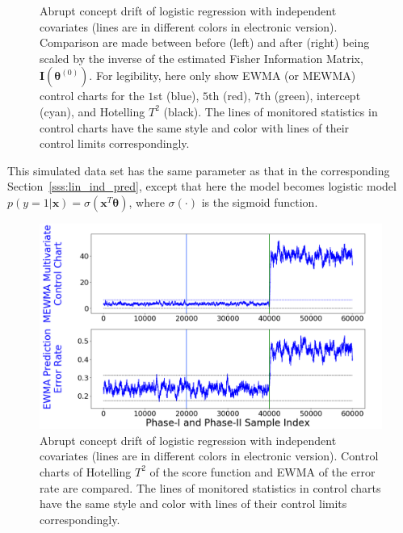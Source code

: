 \documentclass[twoside,11pt]{article}
\begin{document}
\begin{enumerate}[(I)]
\begin{figure}[!htbp]
  \caption{Abrupt concept drift of logistic regression with independent {covariates} (lines are in different colors in electronic version). Comparison are made between before (left) and after (right) being scaled by {the inverse of the estimated} Fisher Information Matrix, {$\mathbf {I} ( {\bm{\theta}} ^{(0)})$.} For legibility, here only show EWMA (or MEWMA) control charts for the $1$st (blue), $5$th (red), $7$th (green), intercept (cyan), and Hotelling $T^2$ (black). The lines of monitored statistics in control charts have the same style and color with lines of their control limits correspondingly.}
  \label{fig:log_reg_ind_X}
\end{figure}

This simulated data set has the same parameter as that in the corresponding Section~\ref{sss:lin_ind_pred}, except that here the model becomes {logistic model} {$p(y=1|\bm {x})= \sigma (\bm {x}^T\bm { \theta})$,} where $\sigma (\cdot)$ is the sigmoid function.
\begin{figure}[!htbp]
\centering
\includegraphics[width = 0.6\linewidth]{../figures/v14/sim_5/logi_no_muco/1_sim5_logi_1e-08_0_005_1.png}
  \caption{Abrupt concept drift of logistic regression with independent covariates (lines are in different colors in electronic version). Control charts of Hotelling $T^2$ of the score function and EWMA of the error rate are compared. The lines of monitored statistics in control charts have the same style and color with lines of their control limits correspondingly.}
  \label{fig:log_reg_ind_X_comp}
\end{figure}


\end{enumerate}
\end{document}
